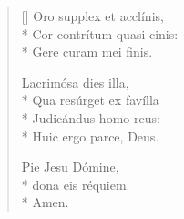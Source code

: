 \begin{multicols}{2}
\begin{flushleft}
\begin{verse}[\versewidth]
Oro supplex et acclínis,        \\*
Cor contrítum quasi cinis:      \\*
Gere curam mei finis.           
                                
Lacrimósa dies illa,            \\*
Qua resúrget ex favílla\\*
Judicándus homo reus:           \\*
Huic ergo parce, Deus.          
                                
Pie Jesu Dómine,                \\*
dona eis réquiem.               \\*
Amen.                           

\end{verse}
\end{flushleft}
\end{multicols}

